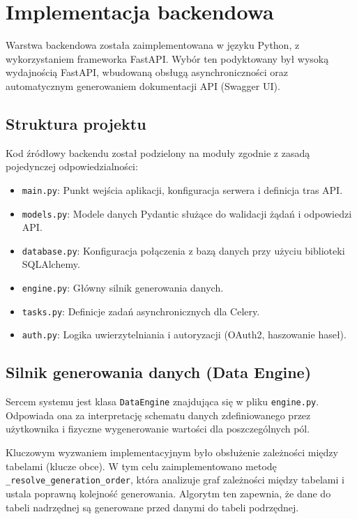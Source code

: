 \section*{Implementacja backendowa}
Warstwa backendowa została zaimplementowana w języku Python, z wykorzystaniem frameworka FastAPI. Wybór ten podyktowany był wysoką wydajnością FastAPI, wbudowaną obsługą asynchroniczności oraz automatycznym generowaniem dokumentacji \gls{API} (Swagger \gls{UI}).

\subsection*{Struktura projektu}
Kod źródłowy backendu został podzielony na moduły zgodnie z zasadą pojedynczej odpowiedzialności:
\begin{itemize}
    \item \texttt{main.py}: Punkt wejścia aplikacji, konfiguracja serwera i definicja tras \gls{API}.
    \item \texttt{models.py}: Modele danych Pydantic służące do walidacji żądań i odpowiedzi \gls{API}.
    \item \texttt{database.py}: Konfiguracja połączenia z bazą danych przy użyciu biblioteki SQLAlchemy.
    \item \texttt{engine.py}: Główny silnik generowania danych.
    \item \texttt{tasks.py}: Definicje zadań asynchronicznych dla Celery.
    \item \texttt{auth.py}: Logika uwierzytelniania i autoryzacji (OAuth2, haszowanie haseł).
\end{itemize}

\subsection*{Silnik generowania danych (Data Engine)}
Sercem systemu jest klasa \texttt{DataEngine} znajdująca się w pliku \texttt{engine.py}. Odpowiada ona za interpretację schematu danych zdefiniowanego przez użytkownika i fizyczne wygenerowanie wartości dla poszczególnych pól.

Kluczowym wyzwaniem implementacyjnym było obsłużenie zależności między tabelami (klucze obce). W tym celu zaimplementowano metodę \texttt{\_resolve\_generation\_order}, która analizuje graf zależności między tabelami i ustala poprawną kolejność generowania. Algorytm ten zapewnia, że dane do tabeli nadrzędnej są generowane przed danymi do tabeli podrzędnej.

